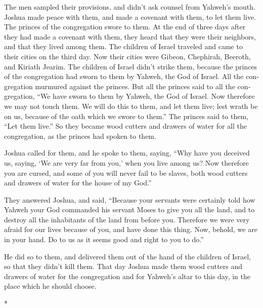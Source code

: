 \begin{paracol}{2}
\begin{otherlanguage}{english}
 The men sampled their provisions, and didn't ask counsel
from Yahweh's mouth.  Joshua made peace with them, and
made a covenant with them, to let them live. The princes of the
congregation swore to them.  At the end of three days
after they had made a covenant with them, they heard that they were
their neighbors, and that they lived among them.  The
children of Israel traveled and came to their cities on the third day.
Now their cities were Gibeon, Chephirah, Beeroth, and Kiriath Jearim.
 The children of Israel didn't strike them, because the
princes of the congregation had sworn to them by Yahweh, the God of
Israel. All the congregation murmured against the princes.
 But all the princes said to all the congregation, ``We
have sworn to them by Yahweh, the God of Israel. Now therefore we may
not touch them.  We will do this to them, and let them
live; lest wrath be on us, because of the oath which we swore to them.''
 The princes said to them, ``Let them live.'' So they
became wood cutters and drawers of water for all the congregation, as
the princes had spoken to them.

 Joshua called for them, and he spoke to them, saying,
``Why have you deceived us, saying, `We are very far from you,' when you
live among us?  Now therefore you are cursed, and some of
you will never fail to be slaves, both wood cutters and drawers of water
for the house of my God.''

 They answered Joshua, and said, ``Because your servants
were certainly told how Yahweh your God commanded his servant Moses to
give you all the land, and to destroy all the inhabitants of the land
from before you. Therefore we were very afraid for our lives because of
you, and have done this thing.  Now, behold, we are in
your hand. Do to us as it seems good and right to you to do.''

 He did so to them, and delivered them out of the hand of
the children of Israel, so that they didn't kill them. 
That day Joshua made them wood cutters and drawers of water for the
congregation and for Yahweh's altar to this day, in the place which he
should choose.

\end{otherlanguage}

\switchcolumn[0]*

\hypertarget{la-procesiuxf3n-de-los-cinco-reyes-contra-gabauxf3n-victoria-de-josuuxe9-en-gabauxf3n}{%
}
\end{paracol}
